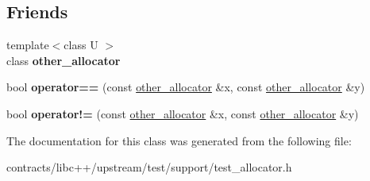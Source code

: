 \subsection*{Friends}
\begin{DoxyCompactItemize}
\item 
\mbox{\label{classother__allocator_ac2de853eba37bd06f19c61ade2963ccf}} 
{\footnotesize template$<$class U $>$ }\\class {\bfseries other\+\_\+allocator}
\item 
\mbox{\label{classother__allocator_a52518b5f4ee3df49c0fee0fc34a24218}} 
bool {\bfseries operator==} (const \mbox{\hyperlink{classother__allocator}{other\+\_\+allocator}} \&x, const \mbox{\hyperlink{classother__allocator}{other\+\_\+allocator}} \&y)
\item 
\mbox{\label{classother__allocator_abca8211f567549c9aa5861eae3a41d1f}} 
bool {\bfseries operator!=} (const \mbox{\hyperlink{classother__allocator}{other\+\_\+allocator}} \&x, const \mbox{\hyperlink{classother__allocator}{other\+\_\+allocator}} \&y)
\end{DoxyCompactItemize}


The documentation for this class was generated from the following file\+:\begin{DoxyCompactItemize}
\item 
contracts/libc++/upstream/test/support/test\+\_\+allocator.\+h\end{DoxyCompactItemize}
